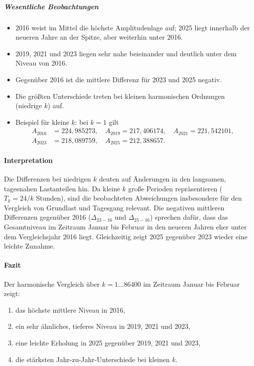 \documentclass[12pt,oneside]{article}
\begin{document}
\subparagraph{Wesentliche Beobachtungen}
\begin{itemize}
  \item 2016 weist im Mittel die höchste Amplitudenlage auf; 2025 liegt innerhalb der neueren Jahre an der Spitze, aber weiterhin unter 2016.
  \item 2019, 2021 und 2023 liegen sehr nahe beieinander und deutlich unter dem Niveau von 2016.
  \item Gegenüber 2016 ist die mittlere Differenz für 2023 und 2025 negativ.
  \item Die größten Unterschiede treten bei kleinen harmonischen Ordnungen (niedrige $k$) auf.
  \item Beispiel für kleine $k$: bei $k=1$ gilt
  \[
  \begin{aligned}
  A_{2016}&=224{,}985273,\quad A_{2019}=217{,}406174,\quad A_{2021}=221{,}542101,\\
  A_{2023}&=218{,}089759,\quad A_{2025}=212{,}388657.
  \end{aligned}
  \]
\end{itemize}

\paragraph{Interpretation}
Die Differenzen bei niedrigen $k$ deuten auf Änderungen in den langsamen, tagesnahen Lastanteilen hin.
Da kleine $k$ große Perioden repräsentieren ($T_k = 24/k$ Stunden), sind die beobachteten Abweichungen
insbesondere für den Vergleich von Grundlast und Tagesgang relevant. Die negativen mittleren Differenzen
gegenüber 2016 ($\Delta_{23-16}$ und $\Delta_{25-16}$) sprechen dafür, dass das Gesamtniveau im Zeitraum
Januar bis Februar in den neueren Jahren eher unter dem Vergleichsjahr 2016 liegt. Gleichzeitig zeigt 2025
gegenüber 2023 wieder eine leichte Zunahme.

\paragraph{Fazit}
Der harmonische Vergleich über $k=1\dots86400$ im Zeitraum Januar bis Februar zeigt:
\begin{enumerate}
  \item das höchste mittlere Niveau in 2016,
  \item ein sehr ähnliches, tieferes Niveau in 2019, 2021 und 2023,
  \item eine leichte Erholung in 2025 gegenüber 2019, 2021 und 2023,
  \item die stärksten Jahr-zu-Jahr-Unterschiede bei kleinen $k$.
\end{enumerate}
\end{document}
